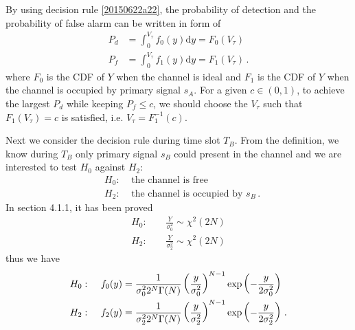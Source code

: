 By using decision rule \eqref{20150622a22}, the probability of detection and the probability of false alarm can be written in form of 
\begin{equation}
  \begin{split}
  P_d &= \int_{0}^{V_\tau} f_0(y) \mathrm{d}y = F_0(V_\tau)\\
  P_f &= \int_{0}^{V_\tau} f_1(y) \mathrm{d}y= F_1(V_\tau)\,.
    \end{split}
    \label{20150622a32}
  \end{equation}
  where $F_0$ is the CDF of $Y$ when the channel is ideal and $F_1$ is the CDF of $Y$ when the channel is occupied by primary signal $s_A$. For a given $c \in (0, 1)$, to achieve the largest  $P_d$ while keeping $P_f \leq c$, we should choose the $V_\tau$ such that $F_1(V_\tau) = c$ is satisfied, i.e. $V_\tau = F^{-1}_1(c)$. 

Next we consider the decision rule during time slot $T_B$. From the definition, we know during $T_B$ only primary signal $s_B$ could present in the channel and we are interested to test $H_0$ against $H_2$:
\begin{equation}
  \begin{split}
&H_0:\;\;\;\;\text{the channel is free}\\
&H_2:\;\;\;\;\text{the channel is occupied by $s_B$}\,.
\end{split}
\end{equation}
In section 4.1.1, it has been proved 
\begin{equation}
\begin{split}
  H_0:\;\;\;\;&\frac{Y}{\sigma_0^2} \sim \chi^2(2N)\\
H_2:\;\;\;\;&\frac{Y}{\sigma_2^2} \sim \chi^2(2N)
\end{split}
\end{equation}
thus we have
\begin{equation}
  \begin{split}
    H_0:\;\;\;\;\;&f_0(y) = \CHISQUY[\sigma_0^2]\\
    H_2:\;\;\;\;\;&f_{2}(y) = \CHISQUY[\sigma_2^2]\,.
  \end{split}
\end{equation}

